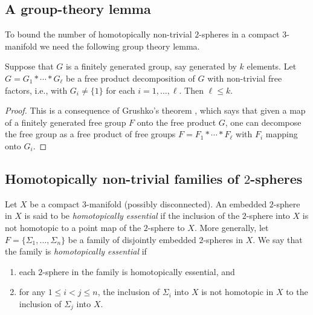 \subsection{A group-theory lemma}

To bound the number of homotopically non-trivial $2$-spheres in a
compact $3$-manifold we need the following group theory lemma.

\begin{lemma}
\label{lem:free-product-rank-bound}
\label{grouptheory}
Suppose that $G$ is a finitely generated group,
say generated by $k$ elements. Let $G=G_1*\cdots*G_\ell$ be a free
product decomposition of $G$ with non-trivial free factors, i.e.,
with $G_i\not=\{1\}$ for each $i=1,\ldots,\ell$. Then $\ell\le k$.
\end{lemma}


\begin{proof}
This is a consequence of Grushko's theorem \cite{Stallings}, which
says that given a map of a finitely generated free group $F$ onto
the  free product $G$, one can decompose the free group as a free
product of free groups $F=F_1*\cdots*F_\ell$ with $F_i$ mapping onto
$G_i$.
\end{proof}

\subsection{Homotopically non-trivial families of $2$-spheres}



\begin{definition}
\label{def:homotopically-essential-family}
Let $X$ be a compact $3$-manifold (possibly disconnected). An
embedded $2$-sphere in $X$ is said to be {\em homotopically
essential} if the inclusion of the $2$-sphere into $X$ is not
homotopic to a point map of the $2$-sphere to $X$. More generally,
let $F=\{\Sigma_1,\ldots,\Sigma_n\}$ be a family of disjointly
embedded $2$-spheres in $X$. We say that the family is {\em
homotopically essential} if
\begin{enumerate}
\item[(i)] each $2$-sphere in the family is homotopically essential, and
\item[(ii)] for any $1\le i<j\le n$, the inclusion of $\Sigma_i$ into $X$ is not
homotopic in $X$ to the inclusion of $\Sigma_j$ into $X$.
\end{enumerate}
\end{definition}

